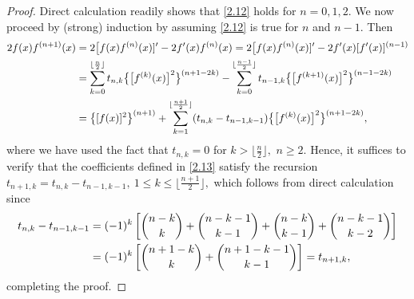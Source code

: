 \documentclass[10pt,a4paper]{amsart}
\begin{document}
\begin{proof}
Direct calculation readily shows that \eqref{2.12} holds for $n=0,1,2$.
We now proceed by (strong) induction by assuming \eqref{2.12} is true for $n$ and $n-1$. Then
\begin{align}
2f(x)f^{(n+1)}(x)&=2\big[f(x)f^{(n)}(x)]'-2f'(x)f^{(n)}(x)=2\big[f(x)f^{(n)}(x)]'-2f'(x)[f'(x)]^{(n-1)} \notag\\
&=\sum_{k=0}^{\lfloor \frac{n}{2}\rfloor} t_{n,k} \big\{\big[f^{(k)}(x)\big]^2\big\}^{(n+1-2k)}-\sum_{k=0}^{\lfloor \frac{n-1}{2}\rfloor} t_{n-1,k} \big\{\big[f^{(k+1)}(x)\big]^2\big\}^{(n-1-2k)}  \notag\\
&=\big\{[f(x)]^2\big\}^{(n+1)}+\sum_{k=1}^{\lfloor \frac{n+1}{2}\rfloor} (t_{n,k} - t_{n-1,k-1}) \big\{\big[f^{(k)}(x)\big]^2\big\}^{(n+1-2k)},
\end{align}
where we have used the fact that $t_{n,k}=0$ for $k>\lfloor\tfrac{n}{2}\rfloor,$ $n\geq2$.
Hence, it suffices to verify that the coefficients defined in \eqref{2.13} satisfy the recursion $t_{n+1,k}=t_{n,k}-t_{n-1,k-1},\ 1\leq k\leq \lfloor \tfrac{n+1}{2}\rfloor,$
which follows from direct calculation since
\begin{align}
t_{n,k}-t_{n-1,k-1}&=(-1)^k \left[\binom{n-k}{k}+\binom{n-k-1}{k-1} +\binom{n-k}{k-1}+\binom{n-k-1}{k-2} \right] \notag\\
&=(-1)^k \left[\binom{n+1-k}{k}+\binom{n+1-k-1}{k-1} \right] =t_{n+1,k},
\end{align}
completing the proof.
\end{proof}
\end{document}
